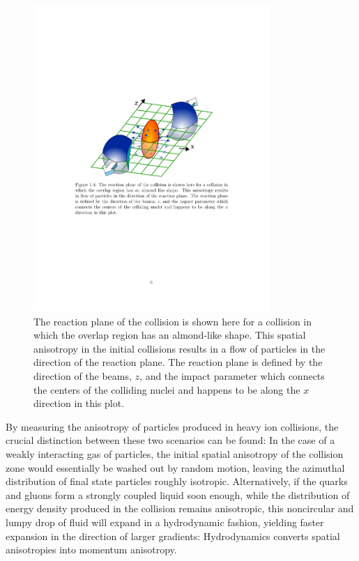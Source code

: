 \begin{figure}[htpb]
  \centering
  \includegraphics[width=0.8\textwidth]{Introduction/overlap_diagram.pdf}
  \caption{The reaction plane of the collision is shown here for a collision in which the overlap region has an almond-like shape. This spatial anisotropy in the initial collisions results in a flow of particles in the direction of the reaction plane. The reaction plane is defined by the direction of the beams, $z$, and the impact parameter which connects the centers of the colliding nuclei and happens to be along the $x$ direction in this plot.}
  \label{fig:overlap}
\end{figure}

By measuring the anisotropy of particles produced in heavy ion collisions, the crucial distinction between these two scenarios can be found: In the case of a weakly interacting gas of particles, the initial spatial anisotropy of the collision zone would essentially be washed out by random motion, leaving the azimuthal distribution of final state particles roughly isotropic. Alternatively, if the quarks and gluons form a strongly coupled liquid soon enough, while the distribution of energy density produced in the collision remains anisotropic, this noncircular and lumpy drop of fluid will expand in a hydrodynamic fashion, yielding faster expansion in the direction of larger gradients: Hydrodynamics converts spatial anisotropies into momentum anisotropy.

